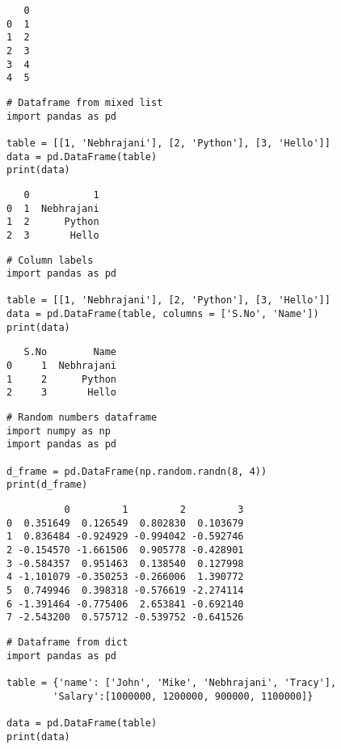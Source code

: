 \documentclass[11pt]{article}
\begin{document}
\begin{verbatim}
   0
0  1
1  2
2  3
3  4
4  5
\end{verbatim}


\begin{verbatim}
# Dataframe from mixed list
import pandas as pd

table = [[1, 'Nebhrajani'], [2, 'Python'], [3, 'Hello']]
data = pd.DataFrame(table)
print(data)
\end{verbatim}

\begin{verbatim}
   0           1
0  1  Nebhrajani
1  2      Python
2  3       Hello
\end{verbatim}


\begin{verbatim}
# Column labels
import pandas as pd

table = [[1, 'Nebhrajani'], [2, 'Python'], [3, 'Hello']]
data = pd.DataFrame(table, columns = ['S.No', 'Name'])
print(data)
\end{verbatim}

\begin{verbatim}
   S.No        Name
0     1  Nebhrajani
1     2      Python
2     3       Hello
\end{verbatim}


\begin{verbatim}
# Random numbers dataframe
import numpy as np
import pandas as pd

d_frame = pd.DataFrame(np.random.randn(8, 4))
print(d_frame)
\end{verbatim}

\begin{verbatim}
          0         1         2         3
0  0.351649  0.126549  0.802830  0.103679
1  0.836484 -0.924929 -0.994042 -0.592746
2 -0.154570 -1.661506  0.905778 -0.428901
3 -0.584357  0.951463  0.138540  0.127998
4 -1.101079 -0.350253 -0.266006  1.390772
5  0.749946  0.398318 -0.576619 -2.274114
6 -1.391464 -0.775406  2.653841 -0.692140
7 -2.543200  0.575712 -0.539752 -0.641526
\end{verbatim}


\begin{verbatim}
# Dataframe from dict
import pandas as pd

table = {'name': ['John', 'Mike', 'Nebhrajani', 'Tracy'],
        'Salary':[1000000, 1200000, 900000, 1100000]}

data = pd.DataFrame(table)
print(data)
\end{verbatim}
\end{document}
